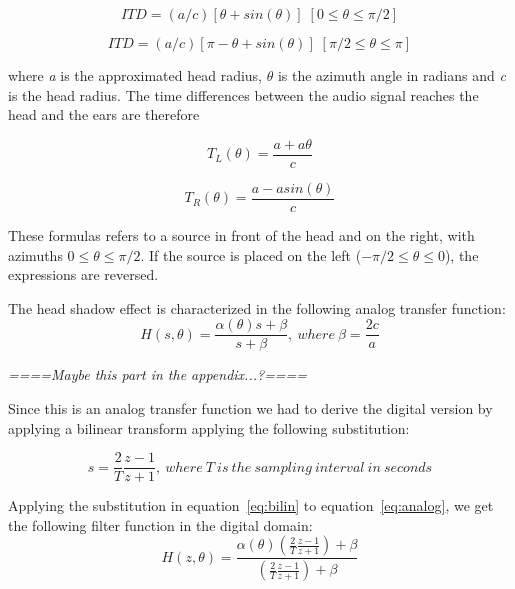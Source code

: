 \documentclass[journal]{IEEEtran}
\begin{document}
\begin{equation}\label{eq:ITDfront}
ITD = (a/c)[\theta + sin(\theta)]   \; [0 \leq \theta \leq \pi/2]
\end{equation}

\begin{equation}\label{eq:ITDback}
ITD = (a/c)[\pi - \theta + sin(\theta)]  \; [\pi/2 \leq \theta \leq \pi]
\end{equation}


where \textit{a} is the approximated head radius, $\theta$ is the azimuth angle in radians and \textit{c} is the head radius. The time differences between the audio signal reaches the head and the ears are therefore

\begin{equation}\label{eq:ITDL}
T_{L} (\theta) = \frac{a+a\theta}{c}
\end{equation}

\begin{equation}\label{eq:ITDR}
T_{R} (\theta) = \frac{a-a sin(\theta)}{c}
\end{equation}

These formulas refers to a source in front of the head and on the right, with azimuths $0 \leq \theta \leq \pi/2$. If the source is placed on the left ($- \pi/2 \leq \theta \leq 0$), the expressions are reversed.



 The head shadow effect is characterized in the following analog transfer function:
\begin{equation}\label{eq:analog}
H\left( s,\theta\right) = \frac{\alpha (\theta)s+\beta}{s+\beta},\: where\:\beta = \frac{2c}{a}
\end{equation}


\emph{====Maybe this part in the appendix...?====}

Since this is an analog transfer function we had to derive the digital version by applying a bilinear transform applying the following substitution:

\begin{equation}\label{eq:bilin}
s = \frac{2}{T} \frac{z-1}{z+1},\: where\:T\:is\:the\:sampling\:interval\:in\:seconds
\end{equation}

Applying the substitution in equation~\ref{eq:bilin} to equation~\ref{eq:analog}, we get the following filter function in the digital domain:
\begin{equation}\label{eq:filter}
H\left( z,\theta\right) = \frac{\alpha (\theta)(\frac{2}{T} \frac{z-1}{z+1})+\beta}{(\frac{2}{T} \frac{z-1}{z+1})+\beta}
\end{equation}
\end{document}
